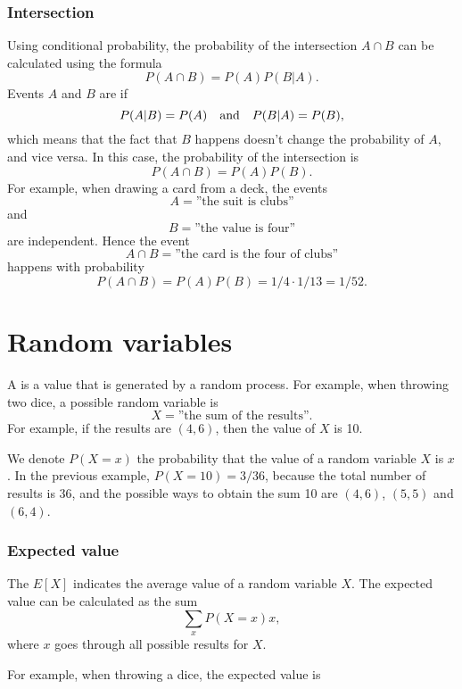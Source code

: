 \subsubsection{Intersection}


Using conditional probability,
the probability of the intersection
$A \cap B$ can be calculated using the formula
\[P(A \cap B)=P(A)P(B|A).\]
Events $A$ and $B$ are  if
\[P(A|B)=P(A) \hspace{10px}\textrm{and}\hspace{10px} P(B|A)=P(B),\]
which means that the fact that $B$ happens doesn't
change the probability of $A$, and vice versa.
In this case, the probability of the intersection is
\[P(A \cap B)=P(A)P(B).\]
For example, when drawing a card from a deck, the events
\[A = \textrm{''the suit is clubs''}\]
and
\[B = \textrm{''the value is four''}\]
are independent. Hence the event
\[A \cap B = \textrm{''the card is the four of clubs''}\]
happens with probability
\[P(A \cap B)=P(A)P(B)=1/4 \cdot 1/13 = 1/52.\]

\section{Random variables}


A  is a value that is generated
by a random process.
For example, when throwing two dice,
a possible random variable is
\[X=\textrm{''the sum of the results''}.\]
For example, if the results are $(4,6)$,
then the value of $X$ is 10.

We denote $P(X=x)$ the probability that
the value of a random variable $X$ is $x$.
In the previous example, $P(X=10)=3/36$,
because the total number of results is 36,
and the possible ways to obtain the sum 10 are
$(4,6)$, $(5,5)$ and $(6,4)$.

\subsubsection{Expected value}


The  $E[X]$ indicates the
average value of a random variable $X$.
The expected value can be calculated as the sum
\[\sum_x P(X=x)x,\]
where $x$ goes through all possible results
for $X$.

For example, when throwing a dice,
the expected value is

